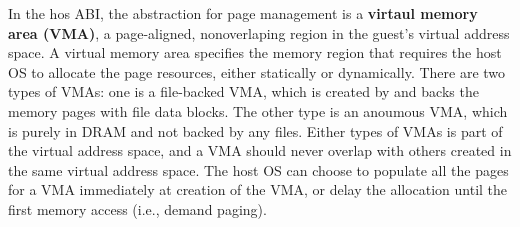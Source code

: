 \label{sec:abi:memory}




In the hos ABI, the abstraction for page management
is a {\bf virtaul memory area (VMA)}, a page-aligned, nonoverlaping region
in the guest's virtual address space.
A virtual memory area
specifies the memory region that requires the host OS to allocate the page resources,
either statically or dynamically.
There are two types of VMAs: one is a file-backed VMA, which is created by  and backs the memory pages with file data blocks.
The other type is an anoumous VMA, which is purely in DRAM and not backed by any files.
Either types of VMAs is part of the virtual address space,
and a VMA should never overlap with others created in the same virtual address space.
The host OS can choose to populate all the pages for a VMA immediately at creation of the VMA,
or delay the allocation until the first memory access (i.e., demand paging).










